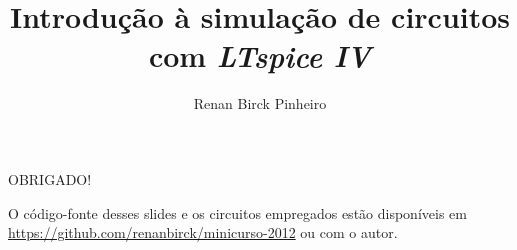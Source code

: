 \documentclass{beamer}
\title{Introdução à simulação de circuitos com \textit{LTspice IV}}
\author{Renan Birck Pinheiro}
\institute{Universidade Federal de Santa Maria}
\begin{document}
\begin{frame}
\titlepage
\end{frame}

\begin{frame}
{\LARGE OBRIGADO!}
\end{frame}

\begin{frame}
O código-fonte desses slides e os circuitos empregados estão disponíveis em \url{https://github.com/renanbirck/minicurso-2012} ou com o autor.
\end{frame}
\end{document}
